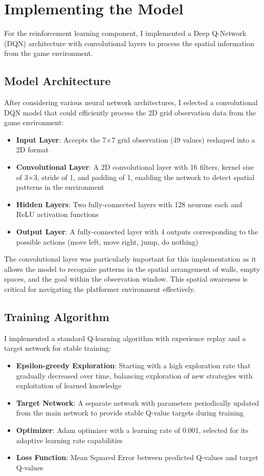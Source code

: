 \section{Implementing the Model}

For the reinforcement learning component, I implemented a Deep Q-Network (DQN) architecture with convolutional layers to process the spatial information from the game environment.

\subsection{Model Architecture}

After considering various neural network architectures, I selected a convolutional DQN model that could efficiently process the 2D grid observation data from the game environment:

\begin{itemize}
    \item \textbf{Input Layer}: Accepts the 7×7 grid observation (49 values) reshaped into a 2D format
    \item \textbf{Convolutional Layer}: A 2D convolutional layer with 16 filters, kernel size of 3×3, stride of 1, and padding of 1, enabling the network to detect spatial patterns in the environment
    \item \textbf{Hidden Layers}: Two fully-connected layers with 128 neurons each and ReLU activation functions
    \item \textbf{Output Layer}: A fully-connected layer with 4 outputs corresponding to the possible actions (move left, move right, jump, do nothing)
\end{itemize}

The convolutional layer was particularly important for this implementation as it allows the model to recognize patterns in the spatial arrangement of walls, empty spaces, and the goal within the observation window. 
This spatial awareness is critical for navigating the platformer environment effectively.

\subsection{Training Algorithm}
I implemented a standard Q-learning algorithm with experience replay and a target network for stable training:

\begin{itemize}
    \item \textbf{Epsilon-greedy Exploration}: Starting with a high exploration rate that gradually decreased over time, balancing exploration of new strategies with exploitation of learned knowledge
    \item \textbf{Target Network}: A separate network with parameters periodically updated from the main network to provide stable Q-value targets during training
    \item \textbf{Optimizer}: Adam optimizer with a learning rate of 0.001, selected for its adaptive learning rate capabilities
    \item \textbf{Loss Function}: Mean Squared Error between predicted Q-values and target Q-values
\end{itemize}

